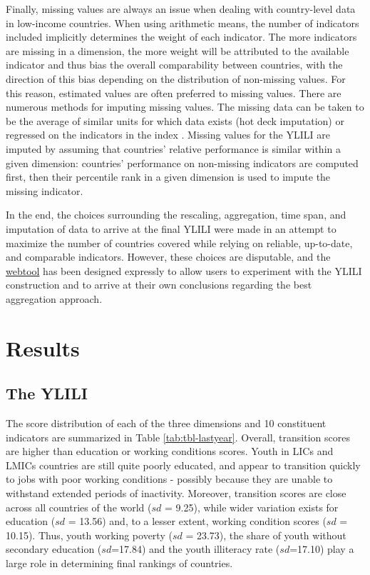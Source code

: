 \documentclass[
  a4paper, twoside, 12pt]{book}
\begin{document}
Finally, missing values are always an issue when dealing with country-level data in low-income countries. When using arithmetic means, the number of indicators included implicitly determines the weight of each indicator. The more indicators are missing in a dimension, the more weight will be attributed to the available indicator and thus bias the overall comparability between countries, with the direction of this bias depending on the distribution of non-missing values. For this reason, estimated values are often preferred to missing values. There are numerous methods for imputing missing values. The missing data can be taken to be the average of similar units for which data exists (hot deck imputation) or regressed on the indicators in the index \autocite{oecd2008,wef2018}. Missing values for the YLILI are imputed by assuming that countries' relative performance is similar within a given dimension: countries' performance on non-missing indicators are computed first, then their percentile rank in a given dimension is used to impute the missing indicator.

In the end, the choices surrounding the rescaling, aggregation, time span, and imputation of data to arrive at the final YLILI were made in an attempt to maximize the number of countries covered while relying on reliable, up-to-date, and comparable indicators. However, these choices are disputable, and the \href{https://nadel.shinyapps.io/ylili}{webtool} has been designed expressly to allow users to experiment with the YLILI construction and to arrive at their own conclusions regarding the best aggregation approach.

\hypertarget{yliliresults}{%
\section{Results}\label{yliliresults}}

\hypertarget{the-ylili}{%
\subsection{The YLILI}\label{the-ylili}}

The score distribution of each of the three dimensions and 10 constituent indicators are summarized in Table \ref{tab:tbl-lastyear}. Overall, transition scores are higher than education or working conditions scores. Youth in LICs and LMICs countries are still quite poorly educated, and appear to transition quickly to jobs with poor working conditions - possibly because they are unable to withstand extended periods of inactivity. Moreover, transition scores are close across all countries of the world (\(sd\) = 9.25), while wider variation exists for education (\(sd\) = 13.56) and, to a lesser extent, working condition scores (\(sd\) = 10.15). Thus, youth working poverty (\(sd\) = 23.73), the share of youth without secondary education (\(sd\)=17.84) and the youth illiteracy rate (\(sd\)=17.10) play a large role in determining final rankings of countries.
\end{document}

